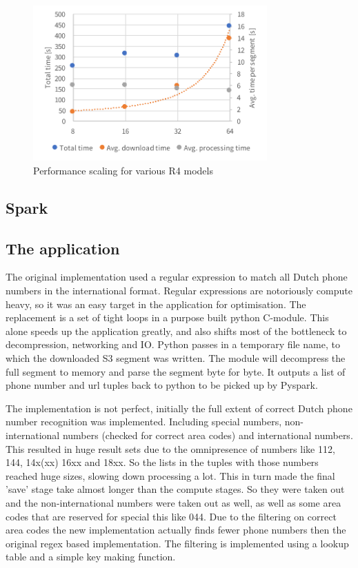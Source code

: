 \documentclass{article}
\begin{document}
\begin{figure}[H]
	\centering
	\includegraphics[width=0.8\textwidth]{resource/r4-scaling.pdf}
	\caption{Performance scaling for various R4 models}
	\label{fig:r4-scaling}
\end{figure}

\subsection{Spark}

\subsection{The application}
The original implementation used a regular expression to match all Dutch phone numbers in the international format.
Regular expressions are notoriously compute heavy, so it was an easy target in the application for optimisation.
The replacement is a set of tight loops in a purpose built python C-module.
This alone speeds up the application greatly, and also shifts most of the bottleneck to decompression, networking and IO.
Python passes in a temporary file name, to which the downloaded S3 segment was written.
The module will decompress the full segment to memory and parse the segment byte for byte.
It outputs a list of phone number and url tuples back to python to be picked up by Pyspark.

The implementation is not perfect, initially the full extent of correct Dutch phone number recognition was implemented.
Including special numbers, non-international numbers (checked for correct area codes) and international numbers.
This resulted in huge result sets due to the omnipresence of numbers like 112, 144, 14x(xx) 16xx and 18xx.
So the lists in the tuples with those numbers reached huge sizes, slowing down processing a lot.
This in turn made the final 'save' stage take almost longer than the compute stages.
So they were taken out and the non-international numbers were taken out as well, as well as some area codes that are reserved for special this like 044.
Due to the filtering on correct area codes the new implementation actually finds fewer phone numbers then the original regex based implementation.
The filtering is implemented using a lookup table and a simple key making function.
\end{document}
